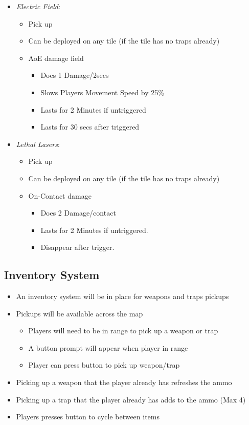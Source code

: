 \documentclass[14pt]{report}
\begin{document}
\begin{itemize}
    \item \emph{Electric Field}:
    \begin{itemize}
        \item Pick up
        \item Can be deployed on any tile (if the tile has no traps already)
        \item AoE damage field
        \begin{itemize}
            \item Does 1 Damage/2secs
            \item Slows Players Movement Speed by 25\%
            \item Lasts for 2 Minutes if untriggered
            \item Lasts for 30 secs after triggered
        \end{itemize}
    \end{itemize}
    \item \emph{Lethal Lasers}:
    \begin{itemize}
        \item Pick up
        \item Can be deployed on any tile (if the tile has no traps already)
        \item On-Contact damage
        \begin{itemize}
            \item Does 2 Damage/contact
            \item Lasts for 2 Minutes if untriggered.
            \item Disappear after trigger.
        \end{itemize}
    \end{itemize}
\end{itemize}

\subsection{Inventory System}

\begin{itemize}
    \item An inventory system will be in place for weapons and traps pickups
    \item Pickups will be available across the map 
    \begin{itemize}
        \item Players will need to be in range to pick up a weapon or trap
        \item A button prompt will appear when player in range
        \item Player can press button to pick up weapon/trap
    \end{itemize}
    \item Picking up a weapon that the player already has refreshes the ammo
    \item Picking up a trap that the player already has adds to the ammo (Max 4)
    \item Players presses button to cycle between items
\end{itemize}
\end{document}
